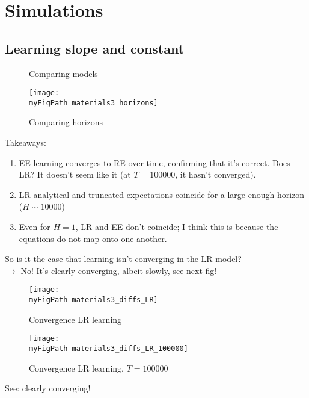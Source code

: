 \documentclass[11pt]{article}
\def \myFigPath {../figures/}
\renewcommand{\[}{\begin{equation}}
\renewcommand{\]}{\end{equation}}
\def\myBiggerFigScale{0.4}
\def\myFigScale{0.3}
\begin{document}
\newpage
\section{Simulations}	
\subsection{Learning slope and constant}
\begin{figure}[h!]
\caption{Comparing models}
\end{figure}

\newpage
\begin{figure}[h!]
\texttt{[image: \\myFigPath materials3\_horizons]}
\caption{Comparing horizons}
\end{figure}

Takeaways:
\begin{enumerate}
\item EE learning converges to RE over time, confirming that it's correct. Does LR? It doesn't seem like it (at $T=100000$, it hasn't converged).
\item LR analytical and truncated expectations coincide for a large enough horizon ($H \sim 10000$)
\item Even for $H=1$, LR and EE don't coincide; I think this is because the equations do not map onto one another.
\end{enumerate}

\newpage
So is it the case that learning isn't converging in the LR model? \\
$\rightarrow$ No! It's clearly converging, albeit slowly, see next fig!

\begin{figure}[h!]
\texttt{[image: \\myFigPath materials3\_diffs\_LR]}
\caption{Convergence LR learning}
\end{figure}

\begin{figure}[h!]
\texttt{[image: \\myFigPath materials3\_diffs\_LR\_100000]}
\caption{Convergence LR learning, $T = 100000$}
\end{figure}

See: clearly converging!  \\
\end{document}
